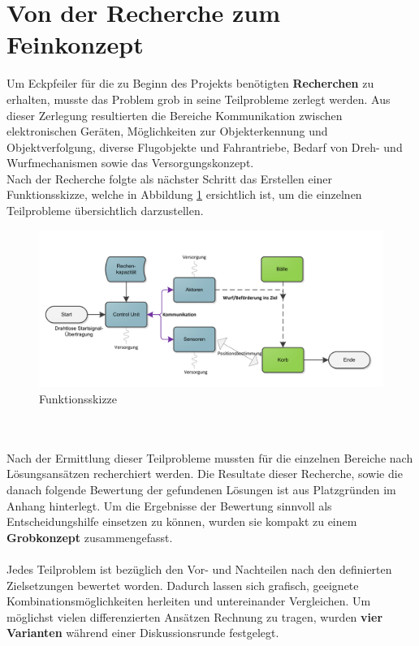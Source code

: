 \section{Von der Recherche zum Feinkonzept}
Um Eckpfeiler für die zu Beginn des Projekts benötigten \textbf{Recherchen} zu erhalten, musste das Problem grob in seine Teilprobleme zerlegt werden. Aus dieser Zerlegung resultierten die Bereiche Kommunikation zwischen elektronischen Geräten, Möglichkeiten zur Objekterkennung und Objektverfolgung, diverse Flugobjekte und Fahrantriebe, Bedarf von Dreh- und Wurfmechanismen sowie das Versorgungskonzept. \\
Nach der Recherche folgte als nächster Schritt das Erstellen einer  Funktionsskizze, welche in Abbildung \ref{fig:Funktionsskizze} ersichtlich ist, um die einzelnen Teilprobleme übersichtlich darzustellen.\\
\begin{figure}[h!]
	\centering
	\includegraphics[width=1\textwidth]{Enddokumentation/Varianten/Bilder/Funktionsskizze.png}
	\caption{Funktionsskizze}
	\label{fig:Funktionsskizze}
\end{figure}
\\\\
Nach der Ermittlung dieser Teilprobleme mussten für die einzelnen Bereiche nach Lösungsansätzen recherchiert werden. Die Resultate dieser Recherche, sowie die danach folgende Bewertung der gefundenen Lösungen ist aus Platzgründen im Anhang hinterlegt. Um die Ergebnisse der Bewertung sinnvoll als Entscheidungshilfe einsetzen zu können, wurden sie kompakt zu einem \textbf{Grobkonzept} zusammengefasst.\\
\\
Jedes Teilproblem ist bezüglich den Vor- und Nachteilen nach den definierten Zielsetzungen bewertet worden. Dadurch lassen sich grafisch, geeignete Kombinationsmöglichkeiten herleiten und untereinander Vergleichen. Um möglichst vielen differenzierten Ansätzen Rechnung zu tragen, wurden \textbf{vier Varianten} während einer Diskussionsrunde festgelegt.\\
